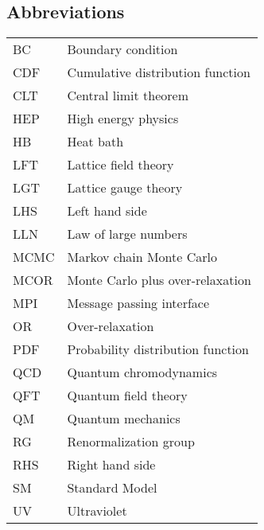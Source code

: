 \documentclass[12pt]{book}
\theoremstyle{definition}
\newenvironment{frontstuff}
  {\centering\chapter*{}}
  {\clearpage}
\begin{document}
\begin{frontstuff}
\section*{Abbreviations}
\begin{tabular}{ll}
BC      &       Boundary condition \\
CDF     &       Cumulative distribution function \\
CLT     &       Central limit theorem\\
HEP     &       High energy physics\\
HB      &       Heat bath\\
LFT     &       Lattice field theory\\
LGT     &       Lattice gauge theory\\
LHS     &       Left hand side\\
LLN     &       Law of large numbers\\
MCMC    &       Markov chain Monte Carlo\\
MCOR    &       Monte Carlo plus over-relaxation \\
MPI     &       Message passing interface \\
OR      &       Over-relaxation \\
PDF     &       Probability distribution function \\
QCD     &       Quantum chromodynamics \\
QFT     &       Quantum field theory \\
QM      &       Quantum mechanics \\
RG      &       Renormalization group \\
RHS     &       Right hand side \\
SM      &       Standard Model \\
UV      &       Ultraviolet \\
\end{tabular}
\clearpage


\end{frontstuff}
\end{document}
